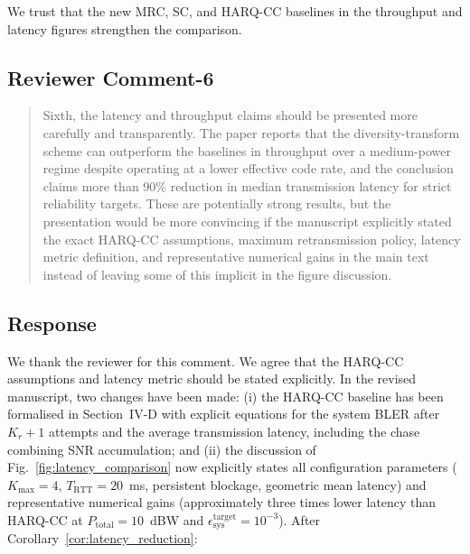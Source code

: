 We trust that the new MRC, SC, and HARQ-CC baselines in the throughput and latency figures strengthen the comparison.


\subsection{Reviewer Comment-6}



\begin{mdframed}
\begin{quote}
Sixth, the latency and throughput claims should be presented more carefully and transparently. The paper reports that the diversity-transform scheme can outperform the baselines in throughput over a medium-power regime despite operating at a lower effective code rate, and the conclusion claims more than 90\% reduction in median transmission latency for strict reliability targets. These are potentially strong results, but the presentation would be more convincing if the manuscript explicitly stated the exact HARQ-CC assumptions, maximum retransmission policy, latency metric definition, and representative numerical gains in the main text instead of leaving some of this implicit in the figure discussion.

\end{quote}

\end{mdframed}


\subsection{Response}

We thank the reviewer for this comment. We agree that the HARQ-CC assumptions and latency metric should be stated explicitly. In the revised manuscript, two changes have been made: (i) the HARQ-CC baseline has been formalised in Section~IV-D with explicit equations for the system BLER after $K_r+1$ attempts and the average transmission latency, including the chase combining SNR accumulation; and (ii) the discussion of Fig.~\ref{fig:latency_comparison} now explicitly states all configuration parameters ($K_{\max} = 4$, $T_{\mathrm{RTT}} = 20$~ms, persistent blockage, geometric mean latency) and representative numerical gains (approximately three times lower latency than HARQ-CC at $P_{\mathrm{total}} = 10$~dBW and $\epsilon_{\mathrm{sys}}^{\mathrm{target}} = 10^{-3}$). After Corollary~\ref{cor:latency_reduction}:

